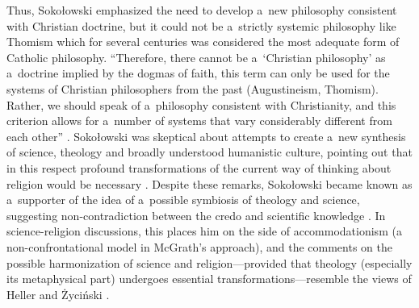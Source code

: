 \documentclass[%
  manuscript=article,
  year=2024,
  volume=77,
  doi=00000.000,
]{zfn}
\begin{document}
Thus, Sokołowski emphasized the need to develop a~new philosophy consistent with Christian doctrine, but it could not be a~strictly systemic philosophy like Thomism which for several centuries was considered the most adequate form of Catholic philosophy. ``Therefore, there cannot be a~‘Christian philosophy' as a~doctrine implied by the dogmas of faith, this term can only be used for the systems of Christian philosophers from the past (Augustineism, Thomism). Rather, we should speak of a~philosophy consistent with Christianity, and this criterion allows for a~number of systems that vary considerably different from each other''
\parencite[][p.199]{Sokoowski1989Gos}. %
 Sokołowski was skeptical about attempts to create a~new synthesis of science, theology and broadly understood humanistic culture, pointing out that in this respect profound transformations of the current way of thinking about religion would be necessary 
\parencite[][p.265]{Sokoowski1991Posowie}. %
 Despite these remarks, Sokołowski became known as a~supporter of the idea of a~possible symbiosis of theology and science, suggesting non-contradiction between the credo and scientific knowledge 
\parencites[se e.g.,][p.214]{Sokoowski2001Wspoczesne}[][p.180]{Sokoowski2014Czy}. %
 In science-religion discussions, this places him on the side of accommodationism (a non-confrontational model in McGrath's approach), and the comments on the possible harmonization of science and religion---provided that theology (especially its metaphysical part) undergoes essential transformations---resemble the views of Heller and Życiński 
\parencite[see e.g.,][]{Zycinski1990Trzy}.%
\end{document}
